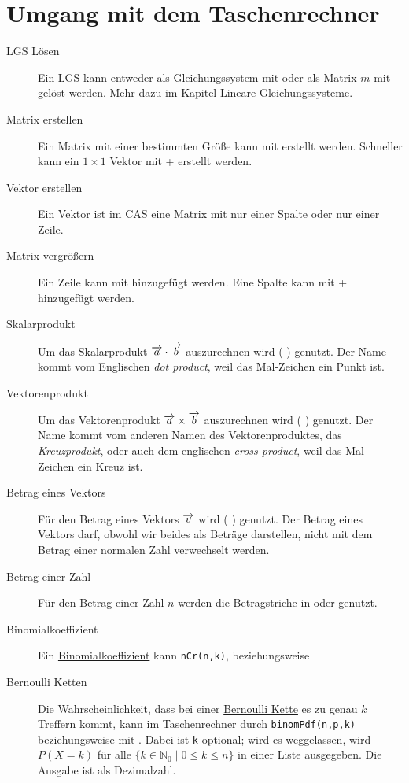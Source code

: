 \documentclass{article}
\begin{document}
\section{Umgang mit dem Taschenrechner}
\begin{description}
 \item[LGS Lösen] Ein LGS kann entweder als Gleichungssystem mit  \arrow {} \arrow {} \arrow {} oder als Matrix $m$ mit  gelöst werden. Mehr dazu im Kapitel \hyperref[Lineare Gleichungssysteme]{Lineare Gleichungssysteme}.
 \item[Matrix erstellen] Ein Matrix mit einer bestimmten Größe kann mit  \arrow {} \arrow {} \arrow {} erstellt werden. Schneller kann ein $1 \times 1$ Vektor mit  + \calckey{(} erstellt werden.
 \item[Vektor erstellen] Ein Vektor ist im CAS eine Matrix mit nur einer Spalte oder nur einer Zeile.  
 \item[Matrix vergrößern] Ein Zeile kann mit \calckey{\return} hinzugefügt werden. Eine Spalte kann mit  + \calckey{\return} hinzugefügt werden.
 \item[Skalarprodukt] Um das Skalarprodukt $\overrightarrow{a} \cdot \overrightarrow{b}$ auszurechnen wird  ( \arrow {} \arrow {} \arrow {}) genutzt. Der Name kommt vom Englischen \emph{dot product}, weil das Mal-Zeichen ein Punkt ist.
 \item[Vektorenprodukt] Um das Vektorenprodukt $\overrightarrow{a} \times \overrightarrow{b}$ auszurechnen wird  ( \arrow {} \arrow {} \arrow {}) genutzt. Der Name kommt vom anderen Namen des Vektorenproduktes, das \emph{Kreuzprodukt}, oder auch dem englischen \emph{cross product}, weil das Mal-Zeichen ein Kreuz ist.  
 \item[Betrag eines Vektors] Für den Betrag eines Vektors $\overrightarrow{v}$ wird  ( \arrow {} \arrow {} \arrow {}) genutzt. Der Betrag eines Vektors darf, obwohl wir beides als Beträge darstellen, nicht mit dem Betrag einer normalen Zahl verwechselt werden.
 \item[Betrag einer Zahl] Für den Betrag einer Zahl $n$ werden die Betragstriche in \symbols oder  genutzt. 
 \item[Binomialkoeffizient] Ein \hyperref[Binomialkoeffizient]{Binomialkoeffizient} kann \texttt{nCr(n,k)}, beziehungsweise  \arrow {} \arrow {}
 \item[Bernoulli Ketten] Die Wahrscheinlichkeit, dass bei einer \hyperref[Bernoulli Ketten]{Bernoulli Kette} es zu genau $k$ Treffern kommt, kann im Taschenrechner durch \texttt{binomPdf(n,p,k)} beziehungsweise mit  \arrow {} \arrow {} \arrow {}. Dabei ist \texttt{k} optional; wird es weggelassen, wird $P(X=k)$ für alle $\{k \in \mathbb{N}_0 \mid 0 \leq k \leq n\}$ in einer Liste ausgegeben. Die Ausgabe ist als Dezimalzahl.
\end{description} 
\end{document}

